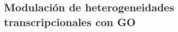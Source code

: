 \documentclass[serif,9pt, t]{beamer}
\begin{document}
\subsection{Modulación de heterogeneidades
transcripcionales con GO}
\end{document}
